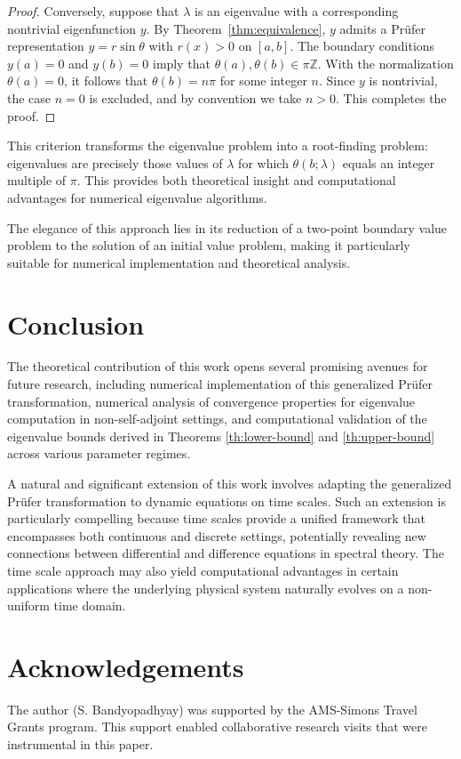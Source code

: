 \documentclass[11pt, reqno]{amsart}
\numberwithin{equation}{section}  %
\theoremstyle{plain}
\theoremstyle{definition}
\theoremstyle{remark}
\begin{document}
\begin{proof}
Conversely, suppose that $\lambda$ is an eigenvalue with a corresponding nontrivial eigenfunction $y$. By Theorem~\ref{thm:equivalence}, $y$ admits a Pr\"ufer representation $y = r\sin\theta$ with $r(x) > 0$ on $[a,b]$. The boundary conditions $y(a) = 0$ and $y(b) = 0$ imply that $\theta(a), \theta(b) \in \pi\mathbb{Z}$. With the normalization $\theta(a) = 0$, it follows that $\theta(b) = n\pi$ for some integer $n$. Since $y$ is nontrivial, the case $n=0$ is excluded, and by convention we take $n > 0$. This completes the proof.
\end{proof}

This criterion transforms the eigenvalue problem into a root-finding problem: eigenvalues are precisely those values of $\lambda$ for which $\theta(b; \lambda)$ equals an integer multiple of $\pi$. This provides both theoretical insight and computational advantages for numerical eigenvalue algorithms.

The elegance of this approach lies in its reduction of a two-point boundary value problem to the solution of an initial value problem, making it particularly suitable for numerical implementation and theoretical analysis.


\section{Conclusion}
The theoretical contribution of this work opens several promising avenues for future research, including numerical implementation of this generalized Pr\"ufer transformation, numerical analysis of convergence properties for eigenvalue computation in non-self-adjoint settings, and computational validation of the eigenvalue bounds derived in Theorems \ref{th:lower-bound} and \ref{th:upper-bound} across various parameter regimes.

A natural and significant extension of this work involves adapting the generalized Pr\"ufer transformation to dynamic equations on time scales. Such an extension is particularly compelling because time scales provide a unified framework that encompasses both continuous and discrete settings, potentially revealing new connections between differential and difference equations in spectral theory. The time scale approach may also yield computational advantages in certain applications where the underlying physical system naturally evolves on a non-uniform time domain.

\section*{Acknowledgements}
The author (S. Bandyopadhyay) was supported by the AMS-Simons Travel Grants program. This support enabled collaborative research visits that were instrumental in this paper.
\end{document}
